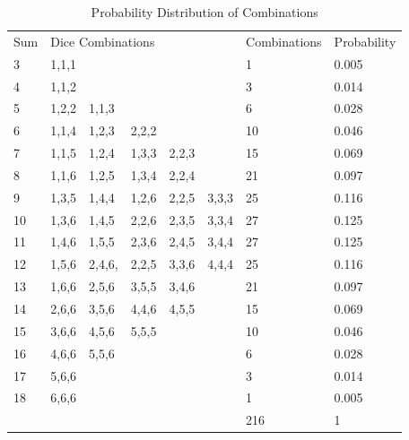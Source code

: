 \documentclass[12pt]{article}
\begin{document}
\begin{table}[h]
\centering
\begin{tabular}{llllllll}
Sum & \multicolumn{5}{l}{Dice Combinations}  & Combinations & Probability \\
3            & 1,1,1 &        &       &       &       & 1                  & 0.005       \\
4            & 1,1,2 &        &       &       &       & 3                  & 0.014       \\
5            & 1,2,2 & 1,1,3  &       &       &       & 6                  & 0.028       \\
6            & 1,1,4 & 1,2,3  & 2,2,2 &       &       & 10                 & 0.046       \\
7            & 1,1,5 & 1,2,4  & 1,3,3 & 2,2,3 &       & 15                 & 0.069       \\
8            & 1,1,6 & 1,2,5  & 1,3,4 & 2,2,4 &       & 21                 & 0.097       \\
9            & 1,3,5 & 1,4,4  & 1,2,6 & 2,2,5 & 3,3,3 & 25                 & 0.116       \\
10           & 1,3,6 & 1,4,5  & 2,2,6 & 2,3,5 & 3,3,4 & 27                 & 0.125       \\
11           & 1,4,6 & 1,5,5  & 2,3,6 & 2,4,5 & 3,4,4 & 27                 & 0.125       \\
12           & 1,5,6 & 2,4,6, & 2,2,5 & 3,3,6 & 4,4,4 & 25                 & 0.116       \\
13           & 1,6,6 & 2,5,6  & 3,5,5 & 3,4,6 &       & 21                 & 0.097       \\
14           & 2,6,6 & 3,5,6  & 4,4,6 & 4,5,5 &       & 15                 & 0.069       \\
15           & 3,6,6 & 4,5,6  & 5,5,5 &       &       & 10                 & 0.046       \\
16           & 4,6,6 & 5,5,6  &       &       &       & 6                  & 0.028       \\
17           & 5,6,6 &        &       &       &       & 3                  & 0.014       \\
18           & 6,6,6 &        &       &       &       & 1                  & 0.005       \\
             &       &        &       &       &       & 216                & 1          
\end{tabular}
\caption{Probability Distribution of Combinations}
\end{table}
\end{document}
